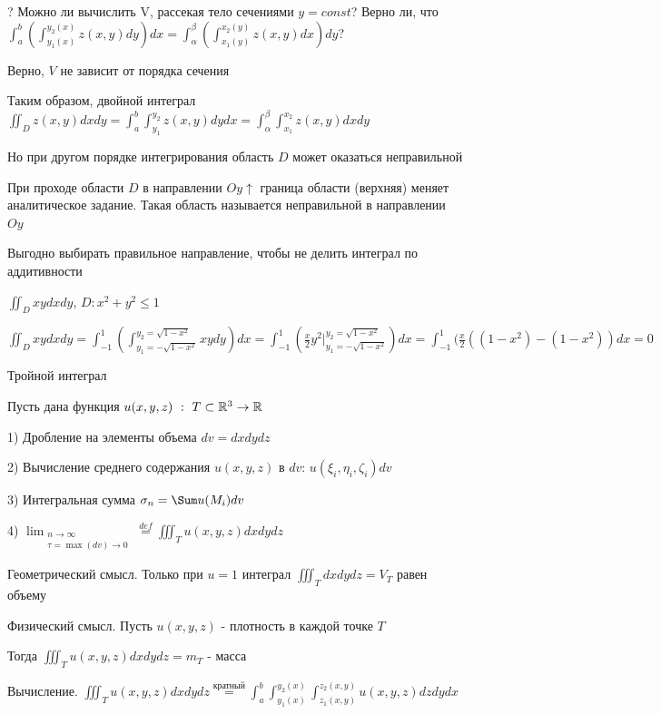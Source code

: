 \documentclass[12pt]{article}
\begin{document}
    ? Можно ли вычислить V, рассекая тело сечениями $y = const$? Верно ли, что $\int_a^b \left(\int_{y_1(x)}^{y_2(x)} z(x, y) dy\right) dx = \int_\alpha^\beta \left(\int_{x_1(y)}^{x_2(y)} z(x, y) dx\right) dy$?

    Верно, $V$ не зависит от порядка сечения

    Таким образом, двойной интеграл $\iint_D z(x, y) dxdy = \int_a^b \int_{y_1}^{y_2} z(x, y) dydx = \int_\alpha^\beta \int_{x_1}^{x_2} z(x, y) dxdy$

    Но при другом порядке интегрирования область $D$ может оказаться неправильной

    \Def При проходе области $D$ в направлении $Oy \uparrow$ граница области (верхняя) меняет аналитическое задание. Такая область называется неправильной в направлении $Oy$

    Выгодно выбирать правильное направление, чтобы не делить интеграл по аддитивности

    \Ex $\iint_D xy dx dy$, $D : x^2 + y^2 \leq 1$

    $\iint_D xy dx dy = \int_{-1}^1 \left(\int_{y_1 = -\sqrt{1-x^2}}^{y_2 = \sqrt{1-x^2}} xy dy\right) dx = \int_{-1}^1 \left(\frac{x}{2} y^2 \Big|_{y_1 = -\sqrt{1-x^2}}^{y_2 = \sqrt{1-x^2}}\right) dx =
    \int_{-1}^1 (\frac{x}{2} ((1 - x^2) - (1 - x^2)) dx = 0$

    \Def Тройной интеграл

    Пусть дана функция $u(x, y, z) \ : \ T \subset \mathbb{R}^3 \rightarrow \mathbb{R}$

    1) Дробление на элементы объема $dv = dxdydz$

    2) Вычисление среднего содержания $u(x, y, z)$ в $dv$: $u(\xi_i, \eta_i, \zeta_i) dv$

    3) Интегральная сумма $\sigma_n = \Sum u(M_i) dv$

    4) $\lim_{\substack{n \to \infty \\ \tau = \max (dv) \to 0}} \stackrel{def}{=} \iiint_T u(x, y, z) dxdydz$

    Геометрический смысл. Только при $u = 1$ интеграл $\iiint_T dxdydz = V_T$ равен объему

    Физический смысл. Пусть $u(x, y, z)$ - плотность в каждой точке $T$

    Тогда $\iiint_T u(x, y, z) dxdydz = m_T$ - масса

    Вычисление. $\iiint_T u(x, y, z) dxdydz \stackrel{\text{кратный}}{=} \int^b_a \int_{y_1(x)}^{y_2(x)} \int_{z_1(x, y)}^{z_2(x, y)} u(x, y, z) dz dy dx$
\end{document}
